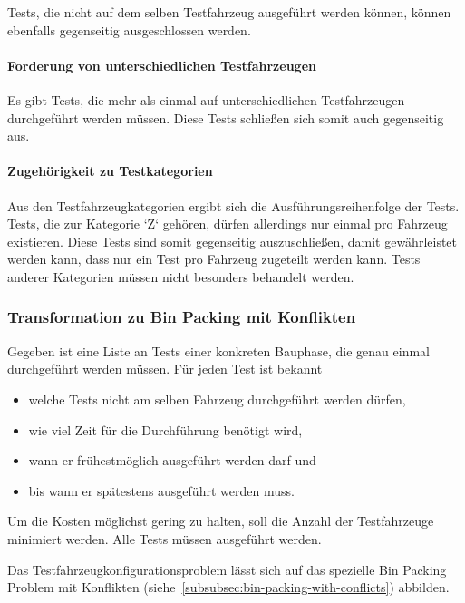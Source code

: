 Tests, die nicht auf dem selben Testfahrzeug ausgeführt werden können,
können ebenfalls gegenseitig ausgeschlossen werden.

\paragraph{Forderung von unterschiedlichen Testfahrzeugen}
Es gibt Tests, die mehr als einmal auf unterschiedlichen Testfahrzeugen
durchgeführt werden müssen. Diese Tests schließen sich somit auch gegenseitig aus.

\paragraph{Zugehörigkeit zu Testkategorien}

Aus den Testfahrzeugkategorien ergibt sich die Ausführungsreihenfolge der Tests.
Tests, die zur Kategorie `Z` gehören, dürfen allerdings nur einmal pro Fahrzeug existieren.
Diese Tests sind somit gegenseitig auszuschließen, damit gewährleistet werden kann,
dass nur ein Test pro Fahrzeug zugeteilt werden kann.
Tests anderer Kategorien müssen nicht besonders behandelt werden.

\subsubsection{Transformation zu Bin Packing mit Konflikten}

Gegeben ist eine Liste an Tests einer konkreten Bauphase, die genau einmal durchgeführt werden müssen.
Für jeden Test ist bekannt
\begin{itemize}
    \item welche Tests nicht am selben Fahrzeug durchgeführt werden dürfen,
    \item wie viel Zeit für die Durchführung benötigt wird,
    \item wann er frühestmöglich ausgeführt werden darf und
    \item bis wann er spätestens ausgeführt werden muss.
\end{itemize}

Um die Kosten möglichst gering zu halten, soll die Anzahl der Testfahrzeuge minimiert werden.
Alle Tests müssen ausgeführt werden.

Das Testfahrzeugkonfigurationsproblem lässt sich auf das spezielle Bin Packing Problem mit Konflikten
(siehe~\cref{subsubsec:bin-packing-with-conflicts}) abbilden.

